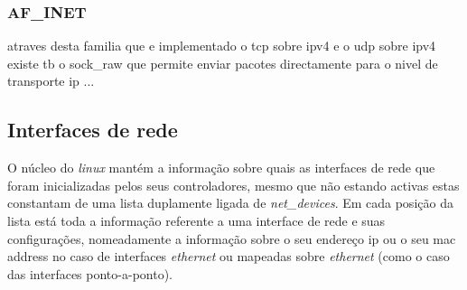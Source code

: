 
\subsubsection{AF\_INET}

atraves desta familia que e implementado o tcp sobre ipv4 e o udp sobre ipv4 existe tb o sock\_raw que permite enviar pacotes directamente para o nivel de transporte ip ... 

% 
%						
%
% 

\subsection{Interfaces de rede}

O núcleo do \textit{linux} mantém a informação sobre quais as interfaces de rede que foram inicializadas pelos seus controladores, mesmo que não estando activas estas constantam de uma lista duplamente ligada de \textit{net\_devices}. 
 Em cada posição da lista está toda a informação referente a uma interface de rede e suas configurações, nomeadamente a informação sobre o seu endereço ip ou o seu mac address no caso de interfaces \textit{ethernet} ou mapeadas sobre \textit{ethernet} (como o caso das interfaces ponto-a-ponto).
 
